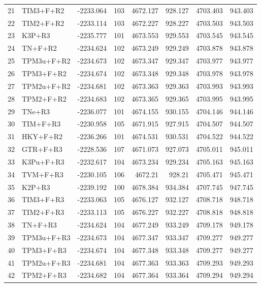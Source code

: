 \begin{longtable}{clrrrrrr}
	21 & TIM3+F+R2 & -2233.064 & 103 & 4672.127 & 928.127 & 4703.403 & 943.403 \\ 
	22 & TIM2+F+R2 & -2233.114 & 103 & 4672.227 & 928.227 & 4703.503 & 943.503 \\ 
	23 & K3P+R3 & -2235.777 & 101 & 4673.553 & 929.553 & 4703.545 & 943.545 \\ 
	24 & TN+F+R2 & -2234.624 & 102 & 4673.249 & 929.249 & 4703.878 & 943.878 \\ 
	25 & TPM3u+F+R2 & -2234.673 & 102 & 4673.347 & 929.347 & 4703.977 & 943.977 \\ 
	26 & TPM3+F+R2 & -2234.674 & 102 & 4673.348 & 929.348 & 4703.978 & 943.978 \\ 
	27 & TPM2u+F+R2 & -2234.681 & 102 & 4673.363 & 929.363 & 4703.993 & 943.993 \\ 
	28 & TPM2+F+R2 & -2234.683 & 102 & 4673.365 & 929.365 & 4703.995 & 943.995 \\ 
	29 & TNe+R3 & -2236.077 & 101 & 4674.155 & 930.155 & 4704.146 & 944.146 \\ 
	30 & TIM+F+R3 & -2230.958 & 105 & 4671.915 & 927.915 & 4704.507 & 944.507 \\ 
	31 & HKY+F+R2 & -2236.266 & 101 & 4674.531 & 930.531 & 4704.522 & 944.522 \\ 
	32 & GTR+F+R3 & -2228.536 & 107 & 4671.073 & 927.073 & 4705.011 & 945.011 \\ 
	33 & K3Pu+F+R3 & -2232.617 & 104 & 4673.234 & 929.234 & 4705.163 & 945.163 \\ 
	34 & TVM+F+R3 & -2230.105 & 106 & 4672.21 & 928.21 & 4705.471 & 945.471 \\ 
	35 & K2P+R3 & -2239.192 & 100 & 4678.384 & 934.384 & 4707.745 & 947.745 \\ 
	36 & TIM3+F+R3 & -2233.063 & 105 & 4676.127 & 932.127 & 4708.718 & 948.718 \\ 
	37 & TIM2+F+R3 & -2233.113 & 105 & 4676.227 & 932.227 & 4708.818 & 948.818 \\ 
	38 & TN+F+R3 & -2234.624 & 104 & 4677.249 & 933.249 & 4709.178 & 949.178 \\ 
	39 & TPM3u+F+R3 & -2234.673 & 104 & 4677.347 & 933.347 & 4709.277 & 949.277 \\ 
	40 & TPM3+F+R3 & -2234.674 & 104 & 4677.348 & 933.348 & 4709.277 & 949.277 \\ 
	41 & TPM2u+F+R3 & -2234.681 & 104 & 4677.363 & 933.363 & 4709.293 & 949.293 \\ 
	42 & TPM2+F+R3 & -2234.682 & 104 & 4677.364 & 933.364 & 4709.294 & 949.294 \\ 

\end{longtable}
